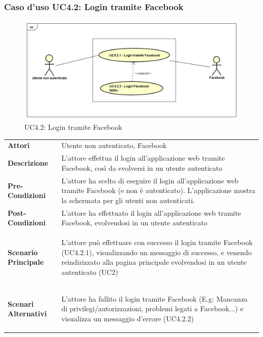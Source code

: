 \newpage
\subsubsection{Caso d'uso UC4.2: Login tramite Facebook }
\label{UC4_2}
\begin{figure}[!htbp]
	\centering
	\includegraphics[scale=0.45]{UML/UC4_2.png}
	\caption{UC4.2: Login tramite Facebook}
\end{figure}

\begin{tabular}{ l | p{11cm}}
	\hline
	\rowcolor{Gray}
	 \multicolumn{2}{c}{UC4.2 - Login tramite Facebook} \\
	 \hline
	\textbf{Attori} & Utente non autenticato, Facebook \\
	\textbf{Descrizione} & L'attore effettua il login all'applicazione web tramite Facebook, così da evolversi in un utente autenticato \\
	\textbf{Pre-Condizioni} & L'attore ha scelto di eseguire il login all'applicazione web tramite Facebook (e non è autenticato). L'applicazione mostra la schermata per gli utenti non autenticati. \\
	\textbf{Post-Condizioni} & L'attore ha effettuato il login all'applicazione web tramite Facebook, evolvendosi in un utente autenticato \\
	\textbf{Scenario Principale} & 
	\begin{enumerate*}[label=(\arabic*.),itemjoin={\newline}]
		\item L'attore può effettuare con successo il login tramite Facebook (UC4.2.1), visualizzando un messaggio di successo, e venendo reindirizzato alla pagina principale evolvendosi in un utente autenticato (UC2)
	\end{enumerate*}\\
	\textbf{Scenari Alternativi} & 
	\begin{enumerate*}[label=(\arabic*.),itemjoin={\newline}]
	\item L'attore ha fallito il login tramite Facebook (E.g: Mancanza di privilegi/autorizzazioni, problemi legati a Facebook...) e visualizza un messaggio d'errore (UC4.2.2)
	\end{enumerate*}\\
\end{tabular}